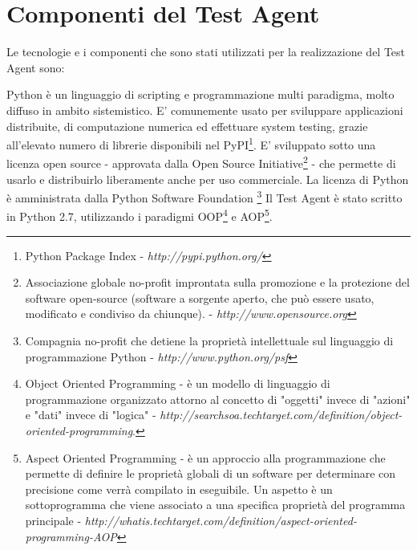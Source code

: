 \section{Componenti del Test Agent}
Le tecnologie e i componenti che sono stati utilizzati per la realizzazione del Test Agent sono:
\newline
\begin{description}[nolistsep]
\item[Python 2.7]
Python è un linguaggio di scripting e programmazione multi paradigma, molto diffuso in ambito sistemistico.
E' comunemente usato per sviluppare applicazioni distribuite, di computazione numerica ed effettuare system testing, grazie all'elevato numero di librerie disponibili nel PyPI\footnote{Python Package Index - \textit{http://pypi.python.org/}}.
E' sviluppato sotto una licenza open source - approvata dalla Open Source Initiative\footnote{Associazione globale no-profit improntata sulla promozione e la protezione del software open-source (software a sorgente aperto, che può essere usato, modificato e condiviso da chiunque). - \textit{http://www.opensource.org}} - che permette di usarlo e distribuirlo liberamente anche per uso commerciale.
\newline La licenza di Python è amministrata dalla Python Software Foundation
\footnote{Compagnia no-profit che detiene la proprietà intellettuale sul linguaggio di programmazione Python - \textit{http://www.python.org/psf}}
\cite{PythonWebsite}
\newline
Il Test Agent è stato scritto in Python 2.7, utilizzando i paradigmi OOP\footnote{Object Oriented Programming - è un modello di linguaggio di programmazione organizzato attorno al concetto di "oggetti" invece di "azioni" e "dati" invece di "logica" - \textit{http://searchsoa.techtarget.com/definition/object-oriented-programming}.} e AOP\footnote{Aspect Oriented Programming - è un approccio alla programmazione che permette di definire le proprietà globali di un software per determinare con precisione come verrà compilato in eseguibile. Un aspetto è un sottoprogramma che viene associato a una specifica proprietà del programma principale - \textit{http://whatis.techtarget.com/definition/aspect-oriented-programming-AOP} }.
\newline


\end{description}

